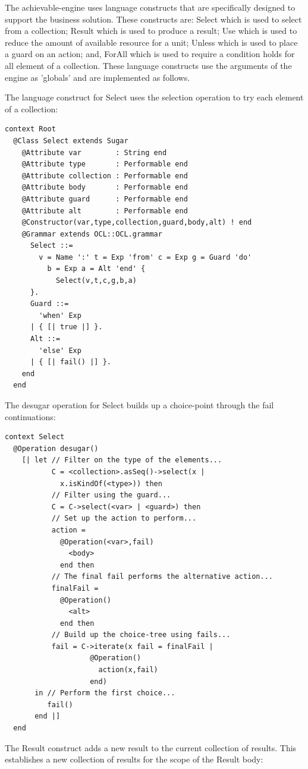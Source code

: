 The achievable-engine uses language constructs that are specifically
designed to support the business solution. These constructs are: Select
which is used to select from a collection; Result which is used to
produce a result; Use which is used to reduce the amount of available
resource for a unit; Unless which is used to place a guard on an action;
and, ForAll which is used to require a condition holds for all element
of a collection. These language constructs use the arguments of the
engine as 'globals' and are implemented as follows.

The language construct for Select uses the selection operation to
try each element of a collection:

\begin{lstlisting}
context Root
  @Class Select extends Sugar
    @Attribute var        : String end
    @Attribute type       : Performable end
    @Attribute collection : Performable end
    @Attribute body       : Performable end
    @Attribute guard      : Performable end
    @Attribute alt        : Performable end
    @Constructor(var,type,collection,guard,body,alt) ! end
    @Grammar extends OCL::OCL.grammar
      Select ::= 
        v = Name ':' t = Exp 'from' c = Exp g = Guard 'do' 
          b = Exp a = Alt 'end' {
            Select(v,t,c,g,b,a)
      }.
      Guard ::=
        'when' Exp
      | { [| true |] }.
      Alt ::= 
        'else' Exp
      | { [| fail() |] }.
    end
  end
\end{lstlisting}The desugar operation for Select builds up a choice-point through
the fail continuations:

\begin{lstlisting}
context Select
  @Operation desugar() 
    [| let // Filter on the type of the elements...
           C = <collection>.asSeq()->select(x | 
             x.isKindOf(<type>)) then
           // Filter using the guard...
           C = C->select(<var> | <guard>) then
           // Set up the action to perform...
           action = 
             @Operation(<var>,fail) 
               <body> 
             end then
           // The final fail performs the alternative action...
           finalFail = 
             @Operation() 
               <alt> 
             end then
           // Build up the choice-tree using fails...
           fail = C->iterate(x fail = finalFail | 
                    @Operation() 
                      action(x,fail) 
                    end)
       in // Perform the first choice...
          fail()
       end |]
  end
\end{lstlisting}The Result construct adds a new result to the current collection of
results. This establishes a new collection of results for the scope
of the Result body:

